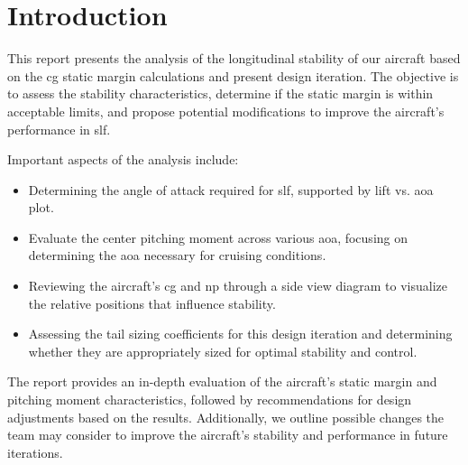 \chapter{Introduction}\label{cp:introduction}

This report presents the analysis of the longitudinal stability of our aircraft based on the \acrfull{cg} static margin calculations and present design iteration. The objective is to assess the stability characteristics, determine if the static margin is within acceptable limits, and propose potential modifications to improve the aircraft's performance in \acrfull{slf}.

Important aspects of the analysis include:

\begin{itemize}
    \item Determining the angle of attack required for \acrshort{slf}, supported by lift vs. \acrfull{aoa} plot.
    \item Evaluate the center pitching moment across various \acrshort{aoa}, focusing on determining the \acrshort{aoa} necessary for cruising conditions.
    \item Reviewing the aircraft's \acrshort{cg} and \acrfull{np} through a side view diagram to visualize the relative positions that influence stability.
    \item Assessing the tail sizing coefficients for this design iteration and determining whether they are appropriately sized for optimal stability and control.
\end{itemize}

The report provides an in-depth evaluation of the aircraft's static margin and pitching moment characteristics, followed by recommendations for design adjustments based on the results. Additionally, we outline possible changes the team may consider to improve the aircraft's stability and performance in future iterations.
